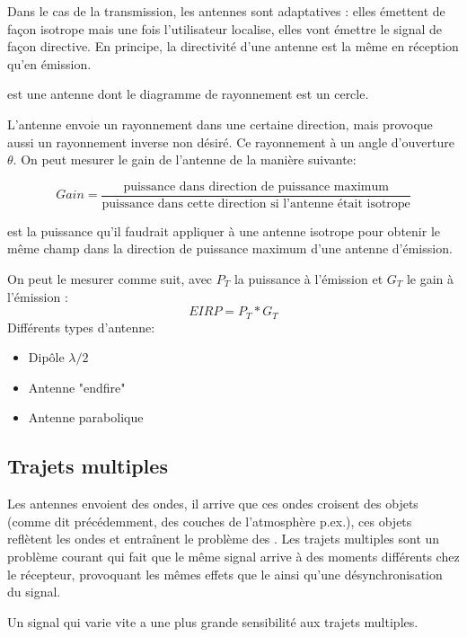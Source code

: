 Dans le cas de la transmission, les antennes sont adaptatives : elles émettent de façon isotrope mais une fois l'utilisateur localise, elles vont émettre le signal de façon directive. En principe, la directivité d'une antenne est la même en réception qu'en émission.

 est une antenne dont le diagramme de rayonnement est un cercle.


L'antenne envoie un rayonnement dans une certaine direction, mais provoque aussi un rayonnement inverse non désiré. Ce rayonnement à un angle d'ouverture $\theta$. On peut mesurer le gain de l'antenne de la manière suivante:

\begin{equation*}
Gain = \frac{\text{puissance dans direction de puissance maximum}}{\text{puissance dans cette direction si l'antenne était isotrope}}
\end{equation*}

 est la puissance qu'il faudrait appliquer à une antenne isotrope pour obtenir le même champ dans la direction de puissance maximum d'une antenne d'émission.

On peut le mesurer comme suit, avec $P_T$ la puissance à l'émission et $G_T$ le gain à l'émission :
\begin{equation*}
EIRP = P_T * G_T
\end{equation*}
Différents types d'antenne:
\begin{itemize}
\item Dipôle $\lambda/2$
\item Antenne "endfire"
\item Antenne parabolique
\end{itemize}

\subsection{Trajets multiples}

Les antennes envoient des ondes, il arrive que ces ondes croisent des objets (comme dit précédemment, des couches de l'atmosphère p.ex.), ces objets reflètent les ondes et entraînent le problème des . Les trajets multiples sont un problème courant qui fait que le même signal arrive à des moments différents chez le récepteur, provoquant les mêmes effets que le  ainsi qu'une désynchronisation du signal.

Un signal qui varie vite a une plus grande sensibilité aux trajets multiples.

